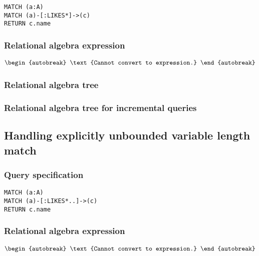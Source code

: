 \begin{lstlisting}
MATCH (a:A)
MATCH (a)-[:LIKES*]->(c)
RETURN c.name
\end{lstlisting}

\subsubsection*{Relational algebra expression}

\begin{align*}
\begin{autobreak}
\text{Cannot convert to expression.}
\end{autobreak}
\end{align*}

\subsubsection*{Relational algebra tree}


\subsubsection*{Relational algebra tree for incremental queries}


\subsection{Handling explicitly unbounded variable length match}

\subsubsection*{Query specification}

\begin{lstlisting}
MATCH (a:A)
MATCH (a)-[:LIKES*..]->(c)
RETURN c.name
\end{lstlisting}

\subsubsection*{Relational algebra expression}

\begin{align*}
\begin{autobreak}
\text{Cannot convert to expression.}
\end{autobreak}
\end{align*}

